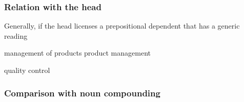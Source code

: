 \documentclass[UTF8, a4paper, oneside, scheme=plain, 12pt]{ctexbook}
\begin{document}
\subsubsection{Relation with the head}

Generally, if the head licenses a prepositional dependent
that has a generic reading 

\begin{exe}
    \ex \begin{xlist}
        \ex management of products
        \ex product management 
    \end{xlist} 
    \ex quality control 
\end{exe}




\subsubsection{Comparison with noun compounding}\label{sec:np.nominal.nominal-attributive.noun-compound-compare}
\end{document}

